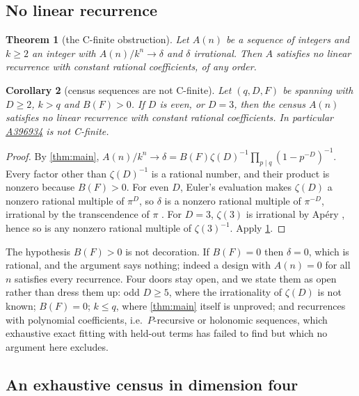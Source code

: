\documentclass[11pt]{amsart}
\newtheorem{theorem}{Theorem}[section]
\newtheorem{corollary}[theorem]{Corollary}
\theoremstyle{definition}
\theoremstyle{remark}
\begin{document}
\subsection{No linear recurrence}

\begin{theorem}[the C-finite obstruction]
\label{thm:cfinite}
Let $A(n)$ be a sequence of integers and $k \ge 2$ an integer with $A(n)/k^{n} \to \delta$ and $\delta$ irrational. Then $A$ satisfies no linear recurrence with constant rational coefficients, of any order.
\end{theorem}

\begin{corollary}[census sequences are not C-finite]
\label{cor:cfinite}
Let $(q,D,F)$ be spanning with $D \ge 2$, $k>q$ and $B(F) > 0$. If $D$ is even, or $D = 3$, then the census $A(n)$ satisfies no linear recurrence with constant rational coefficients. In particular \href{https://oeis.org/A396934}{A396934} is not C-finite.
\end{corollary}

\begin{proof}
By \cref{thm:main}, $A(n)/k^n \to \delta = B(F)\zeta(D)^{-1}\prod_{p \mid q}(1-p^{-D})^{-1}$. Every factor other than $\zeta(D)^{-1}$ is a rational number, and their product is nonzero because $B(F)>0$. For even $D$, Euler's evaluation makes $\zeta(D)$ a nonzero rational multiple of $\pi^{D}$, so $\delta$ is a nonzero rational multiple of $\pi^{-D}$, irrational by the transcendence of $\pi$ \cite{lindemann}. For $D=3$, $\zeta(3)$ is irrational by Ap\'ery \cite{apery}, hence so is any nonzero rational multiple of $\zeta(3)^{-1}$. Apply \cref{thm:cfinite}.
\end{proof}

The hypothesis $B(F)>0$ is not decoration. If $B(F)=0$ then $\delta = 0$, which is rational, and the argument says nothing; indeed a design with $A(n)=0$ for all $n$ satisfies every recurrence. Four doors stay open, and we state them as open rather than dress them up: odd $D \ge 5$, where the irrationality of $\zeta(D)$ is not known; $B(F)=0$; $k \le q$, where \cref{thm:main} itself is unproved; and recurrences with polynomial coefficients, i.e.\ $P$-recursive or holonomic sequences, which exhaustive exact fitting with held-out terms has failed to find but which no argument here excludes.

\subsection{An exhaustive census in dimension four}
\end{document}
